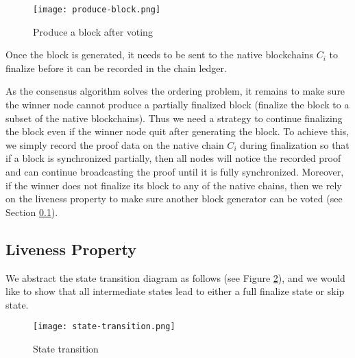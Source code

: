 \begin{figure}[!ht]
\begin{center}
\texttt{[image: produce-block.png]}
\end{center}
\caption{Produce a block after voting}
\label{produce-block}
\end{figure}

Once the block is generated, it needs to be sent to the native blockchains $C_i$ to finalize before it can be recorded in the \dprotocol chain ledger. 

As the consensus algorithm solves the ordering problem, it remains to make sure the winner node cannot produce a partially finalized block (finalize the block to a subset of the native blockchains). Thus we need a strategy to continue finalizing the block even if the winner node quit after generating the block. To achieve this, we simply record the proof data on the native chain $C_i$ during finalization so that if a block is synchronized partially, then all \dprotocol nodes will notice the recorded proof and can continue broadcasting the proof until it is fully synchronized. Moreover, if the winner does not finalize its block to any of the native chains, then we rely on the liveness property to make sure another block generator can be voted (see Section \ref{chp:sub:liveness}).

\subsection{Liveness Property}
\label{chp:sub:liveness}
We abstract the state transition diagram as follows (see Figure \ref{state-transition}), and we would like to show that all intermediate states lead to either a full finalize state or skip state.
\begin{figure}[!ht]
\begin{center}
\texttt{[image: state-transition.png]}
\end{center}
\caption{State transition}
\label{state-transition}
\end{figure}


